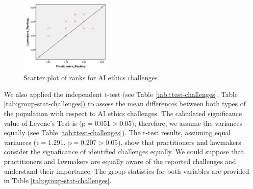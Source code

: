 \begin{figure}
\centering
\includegraphics[width=0.4\textwidth]{Figures/Chall_ranking.drawio.pdf} 
 	\caption{Scatter plot of ranks for AI ethics challenges}
	\label{Fig:Scatter-Ranks-challenges}
\end{figure}

We also applied the independent t-test (see Table \ref{tab:ttest-challenges}, Table \ref{tab:group-stat-challenges}) to assess the mean differences between both types of the population with respect to AI ethics challenges. The calculated significance value of Levene's Test is (p$=$0.051$>$0.05); therefore, we assume the variances equally (see Table \ref{tab:ttest-challenges}). The t-test results, assuming equal variances (t$=$1.291, p$=$0.207$>$0.05), show that practitioners and lawmakers consider the signaficance of identified challenges equally. We could suppose that practitioners and lawmakers are equally aware of the reported challenges and understand their importance. The group statistics for both variables are provided in Table \ref{tab:group-stat-challenges}.
 

